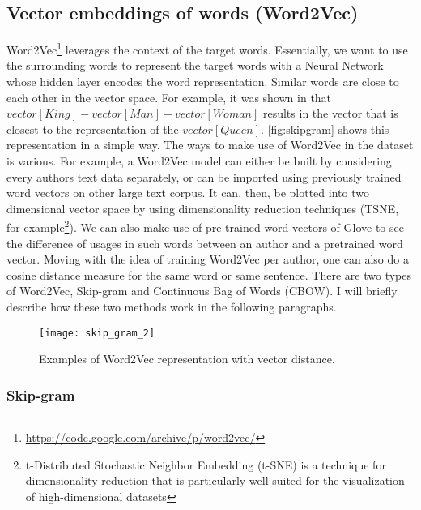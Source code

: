 \subsection{Vector embeddings of words (Word2Vec)}
Word2Vec\footnote{\url{https://code.google.com/archive/p/word2vec/}} leverages the context of the target words. Essentially, we want to use the surrounding words to represent the target words with a Neural Network whose hidden layer encodes the word representation.
Similar words are close
to each other in the vector space. For example, it was shown in \cite{mikolov2013linguistic} that $vector[King] - vector[Man] + vector[Woman]$ results in the vector that is closest to the representation of the $vector[Queen]$.
\autoref{fig:skipgram} shows this representation in a simple way.
The ways to make use of Word2Vec in the dataset is various.
For example, a Word2Vec model can either be built by considering every authors
text data separately, or can be imported using previously trained word vectors on
other large text corpus. It can, then, be plotted into two dimensional vector space
by using dimensionality reduction techniques (TSNE, for example\footnote{t-Distributed Stochastic Neighbor Embedding (t-SNE) is a technique for dimensionality reduction that is particularly well suited for the visualization of high-dimensional datasets}). 
We can also make use of pre-trained word vectors of
Glove to see the difference of usages in such words between an author and a pretrained word vector.
Moving with the idea of training Word2Vec per author, one can also do a cosine
distance measure for the same word or same sentence.
There are two types of Word2Vec, Skip-gram and Continuous Bag of Words (CBOW). I will briefly describe how these two methods work in the following paragraphs.

\begin{figure}[ht]
	\centering
	\texttt{[image: skip\_gram\_2]}
	\caption[Word embedding vector representation]{Examples of Word2Vec representation with vector distance.}
	\label{fig:skipgram}
\end{figure}

\subsubsection{Skip-gram}

